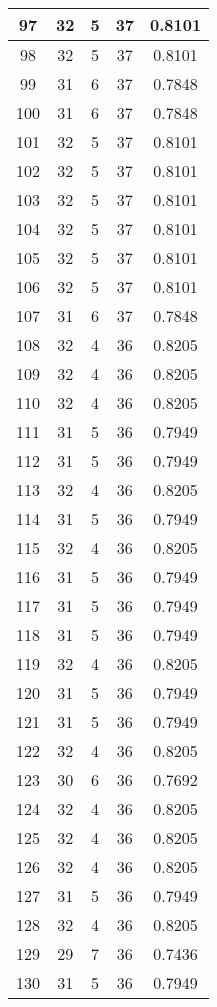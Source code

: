 \documentclass[letterpaper, 12pt]{article}
\begin{document}
\begin{longtable}{|c|c|c|c|c|}
\hline
97 & 32 & 5 & 37 & 0.8101 \\
\hline
98 & 32 & 5 & 37 & 0.8101 \\
\hline
99 & 31 & 6 & 37 & 0.7848 \\
\hline
100 & 31 & 6 & 37 & 0.7848 \\
\hline
101 & 32 & 5 & 37 & 0.8101 \\
\hline
102 & 32 & 5 & 37 & 0.8101 \\
\hline
103 & 32 & 5 & 37 & 0.8101 \\
\hline
104 & 32 & 5 & 37 & 0.8101 \\
\hline
105 & 32 & 5 & 37 & 0.8101 \\
\hline
106 & 32 & 5 & 37 & 0.8101 \\
\hline
107 & 31 & 6 & 37 & 0.7848 \\
\hline
108 & 32 & 4 & 36 & 0.8205 \\
\hline
109 & 32 & 4 & 36 & 0.8205 \\
\hline
110 & 32 & 4 & 36 & 0.8205 \\
\hline
111 & 31 & 5 & 36 & 0.7949 \\
\hline
112 & 31 & 5 & 36 & 0.7949 \\
\hline
113 & 32 & 4 & 36 & 0.8205 \\
\hline
114 & 31 & 5 & 36 & 0.7949 \\
\hline
115 & 32 & 4 & 36 & 0.8205 \\
\hline
116 & 31 & 5 & 36 & 0.7949 \\
\hline
117 & 31 & 5 & 36 & 0.7949 \\
\hline
118 & 31 & 5 & 36 & 0.7949 \\
\hline
119 & 32 & 4 & 36 & 0.8205 \\
\hline
120 & 31 & 5 & 36 & 0.7949 \\
\hline
121 & 31 & 5 & 36 & 0.7949 \\
\hline
122 & 32 & 4 & 36 & 0.8205 \\
\hline
123 & 30 & 6 & 36 & 0.7692 \\
\hline
124 & 32 & 4 & 36 & 0.8205 \\
\hline
125 & 32 & 4 & 36 & 0.8205 \\
\hline
126 & 32 & 4 & 36 & 0.8205 \\
\hline
127 & 31 & 5 & 36 & 0.7949 \\
\hline
128 & 32 & 4 & 36 & 0.8205 \\
\hline
129 & 29 & 7 & 36 & 0.7436 \\
\hline
130 & 31 & 5 & 36 & 0.7949 \\

\end{longtable}
\end{document}
